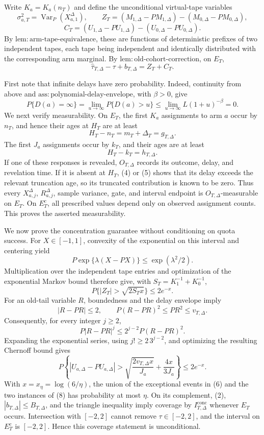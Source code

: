 Write \(K_a=K_a(n_T)\) and define the unconditional virtual-tape variables
\[
 \sigma_{a,T}^2=\operatorname{Var}_P(X_{a,1}^{\Delta}),\qquad
 Z_T=(M_{1,\Delta}-P M_{1,\Delta})-(M_{0,\Delta}-P M_{0,\Delta}),
\]
\[
 C_T=(U_{1,\Delta}-P U_{1,\Delta})-(U_{0,\Delta}-P U_{0,\Delta}).
 \tag{1}
\]
By \(\mathrm{lem:arm\text{-}tape\text{-}equivalence}\), these are functions of deterministic prefixes of two independent tapes, each tape being independent and identically distributed with the corresponding arm marginal.  By \(\mathrm{lem:old\text{-}cohort\text{-}correction}\), on \(E_T\),
\[
 \widehat\tau_{T,\Delta}-\tau+b_{T,\Delta}=Z_T+C_T. \tag{2}
\]

First note that infinite delays have zero probability.  Indeed, continuity from above and \(\mathrm{ass:polynomial\text{-}delay\text{-}envelope}\), with \(\beta>0\), give
\[
 P\{D(a)=\infty\}=\lim_{u\to\infty}P\{D(a)>u\}
 \leq\lim_{u\to\infty}L(1+u)^{-\beta}=0. \tag{3}
\]
We next verify measurability.  On \(E_T\), the first \(K_a\) assignments to arm \(a\) occur by \(n_T\), and hence their ages at \(H_T\) are at least
\[
 H_T-n_T=m_T+\Delta_T=g_{T,\Delta}. \tag{4}
\]
The first \(J_a\) assignments occur by \(k_T\), and their ages are at least
\[
 H_T-k_T=h_{T,\Delta}. \tag{5}
\]
If one of these responses is revealed, \(O_{T,\Delta}\) records its outcome, delay, and revelation time.  If it is absent at \(H_T\), (4) or (5) shows that its delay exceeds the relevant truncation age, so its truncated contribution is known to be zero.  Thus every \(X_{a,j}^{\Delta}\), \(R_{a,j}^{\Delta}\), sample variance, gate, and interval endpoint is \(O_{T,\Delta}\)-measurable on \(E_T\).  On \(E_T^c\), all prescribed values depend only on observed assignment counts.  This proves the asserted measurability.

We now prove the concentration guarantee without conditioning on quota success.  For \(X\in[-1,1]\), convexity of the exponential on this interval and centering yield
\[
 P\exp\{\lambda(X-PX)\}\leq \exp(\lambda^2/2).
\]
Multiplication over the independent tape entries and optimization of the exponential Markov bound therefore give, with \(S_T=K_1^{-1}+K_0^{-1}\),
\[
 P\{|Z_T|>\sqrt{2S_Tx}\}\leq2e^{-x}. \tag{6}
\]
For an old-tail variable \(R\), boundedness and the delay envelope imply
\[
 |R-PR|\leq2,\qquad P(R-PR)^2\leq PR^2\leq v_{T,\Delta}. \tag{7}
\]
Consequently, for every integer \(j\geq2\),
\[
 P|R-PR|^j\leq2^{j-2}P(R-PR)^2.
\]
Expanding the exponential series, using \(j!\geq2\,3^{j-2}\), and optimizing the resulting Chernoff bound gives
\[
 P\left\{|U_{a,\Delta}-PU_{a,\Delta}|>
 \sqrt{\frac{2v_{T,\Delta}x}{J_a}}+\frac{4x}{3J_a}\right\}
 \leq2e^{-x}. \tag{8}
\]
With \(x=x_\eta=\log(6/\eta)\), the union of the exceptional events in (6) and the two instances of (8) has probability at most \(\eta\).  On its complement, (2), \(|b_{T,\Delta}|\leq B_{T,\Delta}\), and the triangle inequality imply coverage by \(I_{T,\Delta}^{\mathrm{conc}}\) whenever \(E_T\) occurs.  Intersection with \([-2,2]\) cannot remove \(\tau\in[-2,2]\), and the interval on \(E_T^c\) is \([-2,2]\).  Hence this coverage statement is unconditional.


